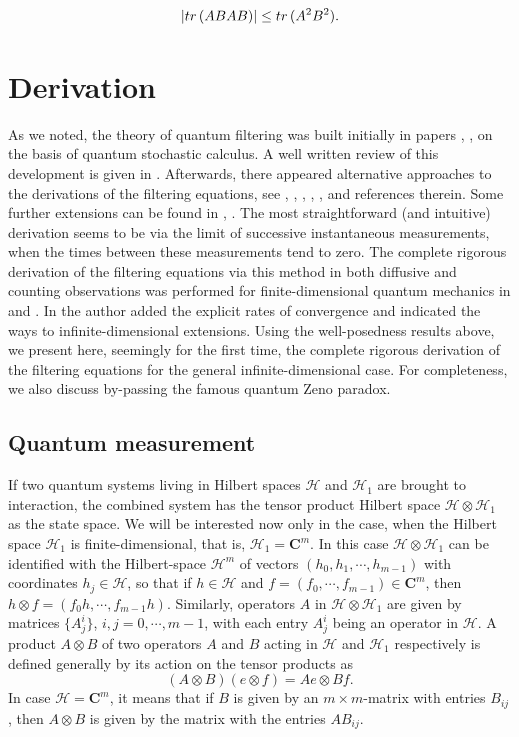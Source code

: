 \documentclass[10pt,a4paper]{amsart}
\def\HC{\mathcal{H}}
\def\C{\mathbf{C}}
\def\tr{\rm{tr}}
\begin{document}
\begin{equation}
\label{eqmyineqtr2}
|{\tr} \, (ABAB)|\le {\tr} \, (A^2 B^2).
\end{equation}


\section{Derivation}
\label{secder}


As we noted, the theory of quantum filtering was built initially in papers
\cite{Bel87}, \cite{Bel88}, \cite{Bel92}
on the basis of quantum stochastic calculus.
A well written review of this development is given in \cite{BoutHanJamQuantFilt}.
Afterwards, there appeared alternative approaches to the derivations of the filtering equations,
see \cite{Attal}, \cite{BelKol},
\cite{Pellegrini}, \cite{BarchBel}, \cite{Holevo91}, \cite{KolQuantFrac} and references therein.
Some further extensions can be found in \cite{BarndLoub}, \cite{Loubenets}.
The most straightforward (and intuitive) derivation seems to be via the limit
of successive instantaneous measurements,
when the times between these measurements tend to zero. The complete rigorous derivation
of the filtering equations via this method  in both diffusive and counting observations
was performed for finite-dimensional quantum mechanics in \cite{Pellegrini} and
\cite{Pellegrini10}. In \cite{KolQuantFrac} the author added the explicit rates of convergence
and indicated the ways to infinite-dimensional extensions.
Using the well-posedness results above, we present here, seemingly for the first
time, the complete rigorous derivation of the filtering equations for the general
infinite-dimensional case. For completeness,
we also discuss by-passing the famous quantum Zeno paradox.


\subsection{Quantum measurement}

If two quantum systems living in Hilbert spaces $\HC$ and $\HC_1$
are brought to interaction, the combined system
has the tensor product Hilbert space  $\HC \otimes \HC_1$ as the state space.
We will be interested now only in the case,
when the Hilbert space $\HC_1$ is finite-dimensional, that is, $\HC_1=\C^m$.
In this case $\HC\otimes \HC_1$ can be identified with the Hilbert-space $\HC^m$
of vectors $(h_0, h_1, \cdots, h_{m-1})$ with
coordinates $h_j\in \HC$, so that if $h\in \HC$ and $f=(f_0, \cdots, f_{m-1})\in \C^m$, then
$h\otimes f=(f_0 h, \cdots, f_{m-1} h)$.
Similarly, operators $A$ in $\HC \otimes \HC_1$ are
given by matrices $\{A^i_j\}$, $i,j=0, \cdots , {m-1}$,
with each entry $A^i_j$ being an operator in $\HC$.
A product $A\otimes B$ of two operators $A$ and $B$ acting in $\HC$ and $\HC_1$ respectively
is defined generally by its action on the tensor products as
\[
(A\otimes B)(e\otimes f)=Ae\otimes Bf.
\]
In case $\HC=\C^m$, it means that if $B$ is given by an $m\times m$-matrix with entries $B_{ij}$,
then $A\otimes B$ is given by the matrix with the entries $AB_{ij}$.
\end{document}
